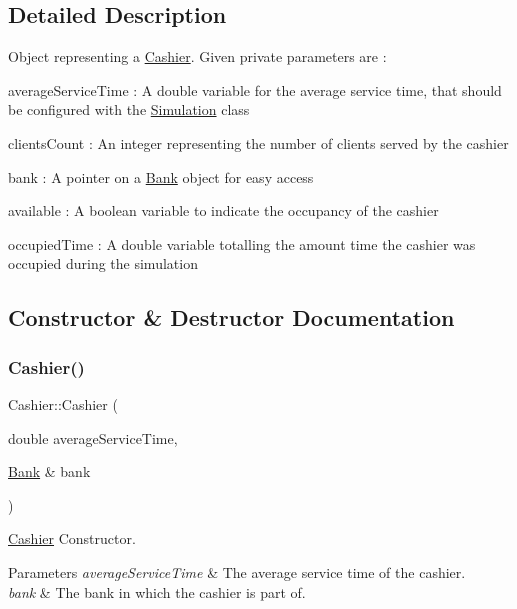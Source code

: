 \subsection{Detailed Description}
Object representing a \hyperlink{classCashier}{Cashier}. Given private parameters are \+:
\begin{DoxyItemize}
\item average\+Service\+Time \+: A double variable for the average service time, that should be configured with the \hyperlink{classSimulation}{Simulation} class
\item clients\+Count \+: An integer representing the number of clients served by the cashier
\item bank \+: A pointer on a \hyperlink{classBank}{Bank} object for easy access
\item available \+: A boolean variable to indicate the occupancy of the cashier
\item occupied\+Time \+: A double variable totalling the amount time the cashier was occupied during the simulation 
\end{DoxyItemize}

\subsection{Constructor \& Destructor Documentation}
\mbox{\label{classCashier_a1616d49e92657698805bb9672df8c019}} 
\subsubsection{\texorpdfstring{Cashier()}{Cashier()}\hspace{0.1cm}{\footnotesize\ttfamily [1/2]}}
{\footnotesize\ttfamily Cashier\+::\+Cashier (\begin{DoxyParamCaption}\item[{double}]{average\+Service\+Time,  }\item[{\hyperlink{classBank}{Bank} \&}]{bank }\end{DoxyParamCaption})}

\hyperlink{classCashier}{Cashier} Constructor. 
\begin{DoxyParams}{Parameters}
{\em average\+Service\+Time} & The average service time of the cashier. \\
\hline
{\em bank} & The bank in which the cashier is part of. \\
\hline
\end{DoxyParams}
\mbox{\label{classCashier_a1a4f6f058122e7c8d47eae5e64334ed6}} 
